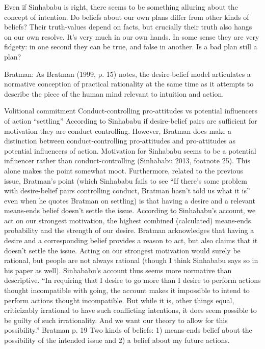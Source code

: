 Even if Sinhababu is right, there seems to be something alluring about the concept of intention. Do beliefs about our own plans differ from other kinds of beliefs? Their truth-values depend on facts, but crucially their truth also hangs on our own resolve. It’s very much in our own hands. In some sense they are very fidgety: in one second they can be true, and false in another.
Is a bad plan still a plan?

Bratman:
As Bratman (1999, p. 15) notes, the desire-belief model articulates a normative conception of practical rationality at the same time as it attempts to describe the piece of the human mind relevant to intuition and action.

Volitional commitment
Conduct-controlling pro-attitudes vs potential influencers of action
“settling”
According to Sinhababu if desire-belief pairs are sufficient for motivation they are conduct-controlling. However, Bratman does make a distinction between conduct-controlling pro-attitudes and pro-attitudes as potential influencers of action. Motivation for Sinhababu seems to be a potential influencer rather than conduct-controlling (Sinhababu 2013, footnote 25). This alone makes the point somewhat moot.
Furthermore, related to the previous issue, Bratman’s point (which Sinhababu fails to see “If there’s some problem with desire-belief pairs controlling conduct, Bratman hasn’t told us what it is” even when he quotes Bratman on settling) is that having a desire and a relevant means-ends belief doesn’t settle the issue. According to Sinhababu’s account, we act on our strongest motivation, the highest combined (calculated) means-ends probability and the strength of our desire. Bratman acknowledges that having a desire and a corresponding belief provides a reason to act, but also claims that it doesn’t settle the issue. Acting on our strongest motivation would surely be rational, but people are not always rational (though I think Sinhababu says so in his paper as well). Sinhababu’s account thus seems more normative than descriptive.
“In requiring that I desire to go more than I desire to perform actions thought incompatible with going, the account makes it impossible to intend to perform actions thought incompatible. But while it is, other things equal, criticizably irrational to have such conflicting intentions, it does seem possible to be guilty of such irrationality. And we want our theory to allow for this possibility.” Bratman p. 19
Two kinds of beliefs: 1) means-ends belief about the possibility of the intended issue and 2) a belief about my future actions.

